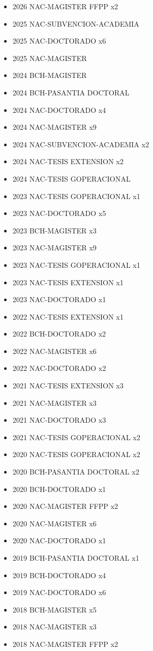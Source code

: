 {\begin{itemize}
\item 2026 NAC-MAGISTER FFPP x2
\item 2025 NAC-SUBVENCION-ACADEMIA
\item 2025 NAC-DOCTORADO x6
\item 2025 NAC-MAGISTER
\item 2024 BCH-MAGISTER
\item 2024 BCH-PASANTIA DOCTORAL
\item 2024 NAC-DOCTORADO x4
\item 2024 NAC-MAGISTER x9
\item 2024 NAC-SUBVENCION-ACADEMIA x2
\item 2024 NAC-TESIS EXTENSION x2
\item 2024 NAC-TESIS GOPERACIONAL
\item 2023 NAC-TESIS GOPERACIONAL x1
\item 2023 NAC-DOCTORADO x5
\item 2023 BCH-MAGISTER x3
\item 2023 NAC-MAGISTER x9
\item 2023 NAC-TESIS GOPERACIONAL x1
\item 2023 NAC-TESIS EXTENSION x1
\item 2023 NAC-DOCTORADO x1
\item 2022 NAC-TESIS EXTENSION x1
\item 2022 BCH-DOCTORADO x2
\item 2022 NAC-MAGISTER x6
\item 2022 NAC-DOCTORADO x2
\item 2021 NAC-TESIS EXTENSION x3
\item 2021 NAC-MAGISTER x3
\item 2021 NAC-DOCTORADO x3
\item 2021 NAC-TESIS GOPERACIONAL x2
\item 2020 NAC-TESIS GOPERACIONAL x2
\item 2020 BCH-PASANTIA DOCTORAL x2
\item 2020 BCH-DOCTORADO x1
\item 2020 NAC-MAGISTER FFPP x2
\item 2020 NAC-MAGISTER x6
\item 2020 NAC-DOCTORADO x1
\item 2019 BCH-PASANTIA DOCTORAL x1
\item 2019 BCH-DOCTORADO x4
\item 2019 NAC-DOCTORADO x6
\item 2018 BCH-MAGISTER x5
\item 2018 NAC-MAGISTER x3
\item 2018 NAC-MAGISTER FFPP x2
\end{itemize}
}

